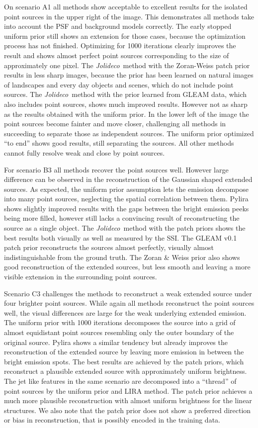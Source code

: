 \documentclass[twocolumn]{aastex631}
\newcommand{\jolideco}{\textit{Jolideco}~}
\begin{document}
    On scenario A1 all methods show acceptable to excellent results for the isolated point sources in the upper right of the image. This demonstrates all methods take into account the PSF and background models correctly. The early stopped uniform prior still shows an extension for those cases, because the optimization process has not finished. Optimizing for 1000 iterations clearly improves the result and shows almost perfect point sources corresponding to the size of approximately one pixel. The \jolideco method with the Zoran-Weiss patch prior results in less sharp images, because the prior has been learned on natural images of landscapes and every day objects and scenes, which do not include point sources. The \jolideco method with the prior learned from GLEAM data, which also includes point sources, shows much improved results. However not as sharp as the results obtained with the uniform prior. In the lower left of the image the point sources become fainter and move closer, challenging all methods in succeeding to separate those as independent sources. The uniform prior optimized \enquote{to end} shows good results, still separating the sources. All other methods cannot fully resolve weak and close by point sources.
    
    For scenario B3 all methods recover the point sources well. However large difference can be observed in the reconstruction of the Gaussian shaped extended sources. As expected, the uniform prior assumption lets the emission decompose into many point sources, neglecting the spatial correlation between them. Pylira shows slightly improved results with the gaps between the bright emission peeks being more filled, however still lacks a convincing result of reconstructing the source as a single object. The \jolideco method with the patch priors shows the best results both visually as well as measured by the SSI. The GLEAM v0.1 patch prior reconstructs the sources almost perfectly, visually almost indistinguishable from the ground truth. The Zoran \& Weiss prior also shows good reconstruction of the extended sources, but less smooth and leaving a more visible extension in the surrounding point sources.

    Scenario C3 challenges the methods to reconstruct a weak extended source under four brighter point sources. While again all methods reconstruct the point sources well, the visual differences are large for the weak underlying extended emission. The uniform prior with 1000 iterations decomposes the source into a grid of almost equidistant point sources resembling only the outer boundary of the original source. Pylira shows a similar tendency but already improves the reconstruction of the extended source by leaving more emission in between the bright emission spots. The best results are achieved by the patch priors, which reconstruct a plausible extended source with approximately uniform brightness. The jet like features in the same scenario are decomposed into a \enquote{thread} of point sources by the uniform prior and LIRA method. The patch prior achieves a much more plausible reconstruction with almost uniform brightness for the linear structures. We also note that the patch prior does not show a preferred direction or bias in reconstruction, that is possibly encoded in the training data.
\end{document}
